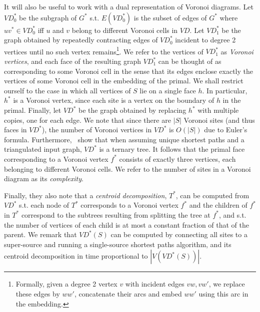 \documentclass[a4paper,UKenglish,cleveref, autoref, thm-restate]{article}
\begin{document}
It will also be useful to work with a dual representation of Voronoi diagrams. Let $\textit{VD}^*_0$ be the subgraph of $G^*$ s.t. $E(\textit{VD}^*_0)$ is the subset of edges of $G^*$ where $uv^* \in \textit{VD}^*_0$ iff $u$ and $v$ belong to different Voronoi cells in $\textit{VD}$. Let $\textit{VD}^*_1$ be the graph obtained by repeatedly contracting edges of $\textit{VD}^*_0$ incident to degree 2 vertices until no such vertex remains\footnote{Formally, given a degree 2 vertex $v$ with incident edges $vw, vw'$, we replace these edges by $ww'$, concatenate their arcs and embed $ww'$ using this arc in the embedding.}. We refer to the vertices of $\textit{VD}^*_1$ as \textit{Voronoi vertices}, and each face of the resulting graph $\textit{VD}^*_1$ can be thought of as corresponding to some Voronoi cell in the sense that its edges enclose exactly the vertices of some Voronoi cell in the embedding of the primal. We shall restrict ourself to the case in which all vertices of $S$ lie on a single face $h$. In particular, $h^*$ is a Voronoi vertex, since each site is a vertex on the boundary of $h$ in the primal. Finally, let $\textit{VD}^*$ be the graph obtained by replacing $h^*$ with multiple copies, one for each edge. We note that since there are $|S|$ Voronoi sites (and thus faces in $\textit{VD}^*$), the number of Voronoi vertices in $\textit{VD}^*$ is $O(|S|)$ due to Euler's formula. Furthermore,~\cite{Gawrychowski2018} show that when assuming unique shortest paths and a triangulated input graph, $\textit{VD}^*$ is a ternary tree. It follows that the primal face corresponding to a Voronoi vertex $f^*$ consists of exactly three vertices, each belonging to different Voronoi cells. We refer to the number of sites in a Voronoi diagram as its \textit{complexity}.

Finally, they also note that a \textit{centroid decomposition}, $T^*$, can be computed from $\textit{VD}^*$ s.t. each node of $T^*$ corresponds to a Voronoi vertex $f^*$ and the children of $f^*$ in $T^*$ correspond to the subtrees resulting from splitting the tree at $f^*$, and s.t. the number of vertices of each child is at most a constant fraction of that of the parent. We remark that $\textit{VD}^*(S)$ can be computed by connecting all sites to a super-source and running a single-source shortest paths algorithm, and its centroid decomposition in time proportional to $|V(\textit{VD}^*(S))|$.
\end{document}
